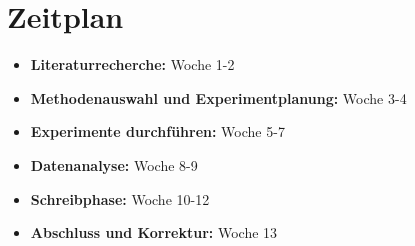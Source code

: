 \section{Zeitplan}

\begin{itemize}
    \item \textbf{Literaturrecherche:} Woche 1-2
    \item \textbf{Methodenauswahl und Experimentplanung:} Woche 3-4
    \item \textbf{Experimente durchführen:} Woche 5-7
    \item \textbf{Datenanalyse:} Woche 8-9
    \item \textbf{Schreibphase:} Woche 10-12
    \item \textbf{Abschluss und Korrektur:} Woche 13
\end{itemize}
